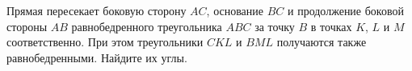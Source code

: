 \begin{ex}
	\begin{condition}
		Прямая пересекает боковую сторону \( AC \), основание \( BC  \) и продолжение боковой стороны \( AB  \) равнобедренного треугольника \( ABC \) за точку \( B  \) в точках \( K \), \(  L  \) и \( M  \) соответственно. При этом треугольники \( CKL \) и \( BML \) получаются также равнобедренными. Найдите их углы.
	\end{condition}
\end{ex}